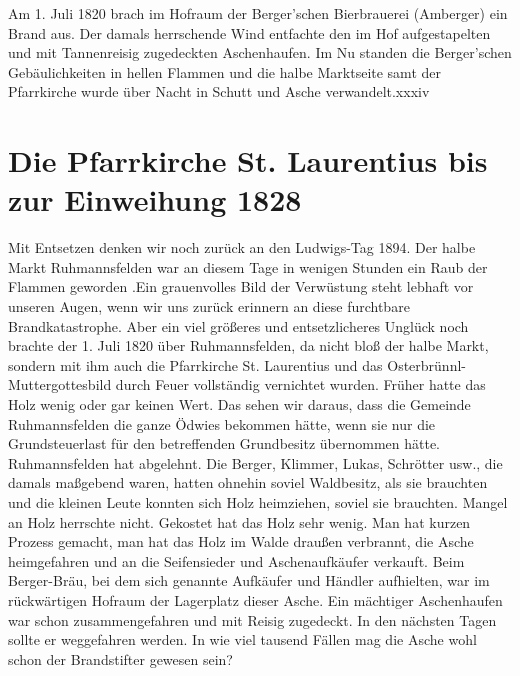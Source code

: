 \documentclass[12pt,a4paper]{book}
\begin{document}
Am 1. Juli 1820 brach im Hofraum der Berger'schen Bierbrauerei (Amberger) ein
Brand aus. Der damals herrschende Wind entfachte den im Hof aufgestapelten und
mit Tannenreisig zugedeckten Aschenhaufen. Im Nu standen die Berger'schen
Gebäulichkeiten in hellen Flammen und die halbe Marktseite samt der Pfarrkirche
wurde über Nacht in Schutt und Asche verwandelt.xxxiv

\chapter{Die Pfarrkirche St. Laurentius bis zur Einweihung 1828}

Mit Entsetzen denken wir noch zurück an den Ludwigs-Tag 1894. Der halbe Markt
Ruhmannsfelden war an diesem Tage in wenigen Stunden ein Raub der Flammen
geworden .Ein grauenvolles Bild der Verwüstung steht lebhaft vor unseren Augen,
wenn wir uns zurück erinnern an diese furchtbare Brandkatastrophe. Aber ein viel
größeres und entsetzlicheres Unglück noch brachte der 1. Juli 1820 über
Ruhmannsfelden, da nicht bloß der halbe Markt, sondern mit ihm auch die
Pfarrkirche St. Laurentius und das Osterbrünnl-Muttergottesbild durch Feuer
vollständig vernichtet wurden. Früher hatte das Holz wenig oder gar keinen Wert.
Das sehen wir daraus, dass die Gemeinde Ruhmannsfelden die ganze Ödwies bekommen
hätte, wenn sie nur die Grundsteuerlast für den betreffenden Grundbesitz
übernommen hätte. Ruhmannsfelden hat abgelehnt. Die Berger, Klimmer, Lukas,
Schrötter usw., die damals maßgebend waren, hatten ohnehin soviel Waldbesitz,
als sie brauchten und die kleinen Leute konnten sich Holz heimziehen, soviel sie
brauchten. Mangel an Holz herrschte nicht. Gekostet hat das Holz sehr wenig. Man
hat kurzen Prozess gemacht, man hat das Holz im Walde draußen verbrannt, die
Asche heimgefahren und an die Seifensieder und Aschenaufkäufer verkauft. Beim
Berger-Bräu, bei dem sich genannte Aufkäufer und Händler aufhielten, war im
rückwärtigen Hofraum der Lagerplatz dieser Asche. Ein mächtiger Aschenhaufen war
schon zusammengefahren und mit Reisig zugedeckt. In den nächsten Tagen sollte er
weggefahren werden. In wie viel tausend Fällen mag die Asche wohl schon der
Brandstifter gewesen sein?
\end{document}
